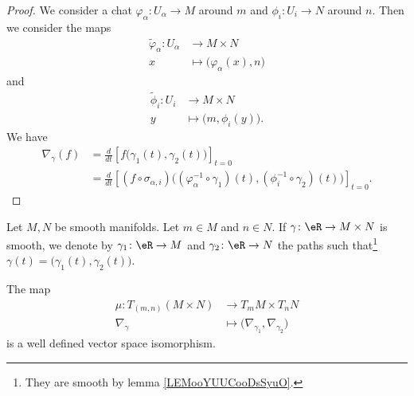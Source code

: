 \begin{proof}
	We consider a chat \(\varphi_{\alpha} \colon U_{\alpha}\to M  \) around \( m\) and \(\phi_i \colon U_i\to N  \) around \( n\). Then we consider the maps
	\begin{equation}
		\begin{aligned}
			\tilde \varphi_{\alpha}\colon U_{\alpha} & \to M\times N                              \\
			x                                        & \mapsto \big( \varphi_{\alpha}(x), n \big)
		\end{aligned}
	\end{equation}
	and
	\begin{equation}
		\begin{aligned}
			\tilde \phi_i\colon U_i & \to M\times N                    \\
			y                       & \mapsto \big( m,\phi_i(y) \big).
		\end{aligned}
	\end{equation}
	We have
	\begin{subequations}
		\begin{align}
			\nabla_{\gamma}(f) & =\frac{d}{dt} \left[ f\Big( \gamma_1(t),\gamma_2(t) \Big)  \right]_{t=0}                                                                        \\
			                   & =\frac{d}{dt} \left[ (f\circ\sigma_{\alpha,i})\Big( (\varphi_{\alpha}^{-1}\circ\gamma_1)(t),(\phi_i^{-1}\circ\gamma_2)(t) \Big)  \right]_{t=0}.
		\end{align}
	\end{subequations}
\end{proof}


\begin{proposition}	\label{PROPooPSELooDDwFru}
	Let \( M,N\) be smooth manifolds. Let \( m\in M\) and \( n\in N\). If \(\gamma \colon \eR\to M\times N  \) is smooth, we denote by \(\gamma_1 \colon \eR\to M  \) and \(\gamma_2 \colon \eR\to N  \) the paths such that\footnote{They are smooth by lemma \ref{LEMooYUUCooDsSyuO}.} \( \gamma(t)=\big( \gamma_1(t),\gamma_2(t) \big)\).

	The map
	\begin{equation}
		\begin{aligned}
			\mu\colon T_{(m,n)}(M\times N) & \to T_mM\times T_nN                                     \\
			\nabla_{\gamma}                & \mapsto \big( \nabla_{\gamma_1},\nabla_{\gamma_2} \big)
		\end{aligned}
	\end{equation}
	is a well defined vector space isomorphism.
\end{proposition}

